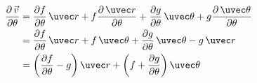 \begin{equation}\begin{aligned}
\frac{{\partial \,\vec v}}{{\partial \theta }} &= \frac{{\partial f}}{{\partial \theta }}\,\uvec r + f\frac{{\partial \,\uvec r}}{{\partial \theta }} + \frac{{\partial g}}{{\partial \theta }}\,\uvec \theta  + g\frac{{\partial \,\uvec \theta }}{{\partial \theta }}\\
 &= \frac{{\partial f}}{{\partial \theta }}\,\uvec r + f\,\uvec \theta + \frac{{\partial g}}{{\partial \theta }}\,\uvec \theta  - g\,\uvec r\\
 &= \left( {\frac{{\partial f}}{{\partial \theta }} - g} \right)\uvec r + \left( {f + \frac{{\partial g}}{{\partial \theta }}} \right)\uvec \theta 
\end{aligned}\end{equation}
 
